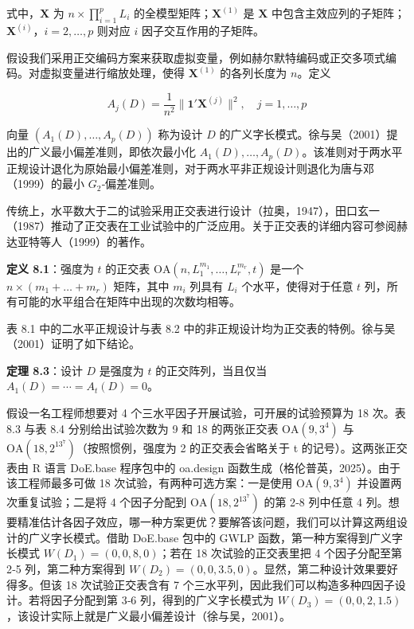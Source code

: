 \documentclass{ctexart}
\begin{document}
式中，$\boldsymbol{X}$ 为 $n\times\prod_{i=1}^{p}L_i$ 的全模型矩阵；$\boldsymbol{X}^{(1)}$ 是 $\boldsymbol{X}$ 中包含主效应列的子矩阵；$\boldsymbol{X}^{(i)}$，$i=2,\dots,p$ 则对应 $i$ 因子交互作用的子矩阵。

假设我们采用正交编码方案来获取虚拟变量，例如赫尔默特编码或正交多项式编码。对虚拟变量进行缩放处理，使得 $\boldsymbol{X}^{(1)}$ 的各列长度为 $n$。定义

\begin{equation*}
A_j(D)=\frac{1}{n^2}\lVert\boldsymbol{1}'\boldsymbol{X}^{(j)}\rVert^2,\quad j=1,\dots,p
\end{equation*}

向量 $(A_1(D),\dots,A_p(D))$ 称为设计 $D$ 的广义字长模式。徐与吴（2001）提出的广义最小偏差准则，即依次最小化 $A_1(D),\dots,A_p(D)$。该准则对于两水平正规设计退化为原始最小偏差准则，对于两水平非正规设计则退化为唐与邓（1999）的最小 $G_2$‑偏差准则。

传统上，水平数大于二的试验采用正交表进行设计（拉奥，1947），田口玄一（1987）推动了正交表在工业试验中的广泛应用。关于正交表的详细内容可参阅赫达亚特等人（1999）的著作。

\begin{mdquote}
\textbf{定义 8.1}：强度为 $t$ 的正交表 $\mathrm{OA}(n,L_1^{m_1},\dots,L_r^{m_r},t)$ 是一个 $n\times(m_1+\dots+m_r)$ 矩阵，其中 $m_i$ 列具有 $L_i$ 个水平，使得对于任意 $t$ 列，所有可能的水平组合在矩阵中出现的次数均相等。
\end{mdquote}

表 8.1 中的二水平正规设计与表 8.2 中的非正规设计均为正交表的特例。徐与吴（2001）证明了如下结论。

\begin{mdquote}
\textbf{定理 8.3}：设计 $D$ 是强度为 $t$ 的正交阵列，当且仅当 $A_1(D)=\cdots=A_t(D)=0$。
\end{mdquote}

假设一名工程师想要对 4 个三水平因子开展试验，可开展的试验预算为 18 次。表 8.3 与表 8.4 分别给出试验次数为 9 和 18 的两张正交表 $\mathrm{OA}(9,3^4)$ 与 $\mathrm{OA}(18,2^13^7)$（按照惯例，强度为 2 的正交表会省略关于 t 的记号）。这两张正交表由 R 语言 DoE.base 程序包中的 oa.design 函数生成（格伦普英，2025）。由于该工程师最多可做 18 次试验，有两种可选方案：一是使用 $\mathrm{OA}(9,3^4)$ 并设置两次重复试验；二是将 4 个因子分配到 $\mathrm{OA}(18,2^13^7)$ 的第 2‑8 列中任意 4 列。想要精准估计各因子效应，哪一种方案更优？要解答该问题，我们可以计算这两组设计的广义字长模式。借助 DoE.base 包中的 GWLP 函数，第一种方案得到广义字长模式 $W(D_1)=(0,0,8,0)$；若在 18 次试验的正交表里把 4 个因子分配至第 2‑5 列，第二种方案得到 $W(D_2)=(0,0,3.5,0)$。显然，第二种设计效果要好得多。但该 18 次试验正交表含有 7 个三水平列，因此我们可以构造多种四因子设计。若将因子分配到第 3‑6 列，得到的广义字长模式为 $W(D_3)=(0,0,2,1.5)$，该设计实际上就是广义最小偏差设计（徐与吴，2001）。
\end{document}
